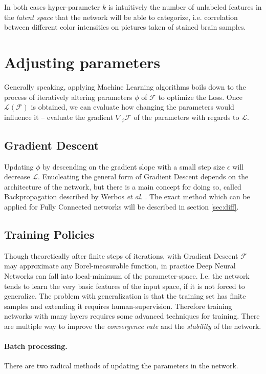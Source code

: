 In both cases hyper-parameter $k$ is intuitively the number of unlabeled features in the \emph{latent space} that the network will be able to categorize, i.e. correlation between different color intensities on pictures taken of stained brain samples.


\section{Adjusting parameters}
Generally speaking, applying Machine Learning algorithms boils down to the process of iteratively altering parameters $\phi$ of $\mathcal{F}$ to optimize the Loss.
Once $\mathcal{L}(\mathcal{F})$ is obtained, we can evaluate how changing the parameters would influence it -- evaluate the gradient $\nabla_\phi \mathcal{F}$ of the parameters  with regards to $\mathcal{L}$.

\subsection{Gradient Descent}
Updating $\phi$ by descending on the gradient slope with a small step size $\epsilon$ will decrease $\mathcal{L}$.
Enucleating the general form of Gradient Descent depends on the architecture of the network, but there is a main concept for doing so, called Backpropagation described by Werbos \emph{et al.} \cite{werbos1994roots}. 
The exact method which can be applied for Fully Connected networks will be described in section \ref{sec:diff}.

\subsection{Training Policies}
Though theoretically after finite steps of iterations, with Gradient Descent $\mathcal{F}$ may approximate any Borel-measurable function, 
in practice Deep Neural Networks can fall into local-minimum of the parameter-space.
I.e. the network tends to learn the very basic features of the input space, if it is not forced to generalize.
The problem with generalization is that the training set has finite samples and extending it requires human-supervision.
Therefore training networks with many layers requires some advanced techniques for training.
There are multiple way to improve the \emph{convergence rate} and the \emph{stability} of the network.

\paragraph{Batch processing.} There are two radical methods of updating the parameters in the network. 

